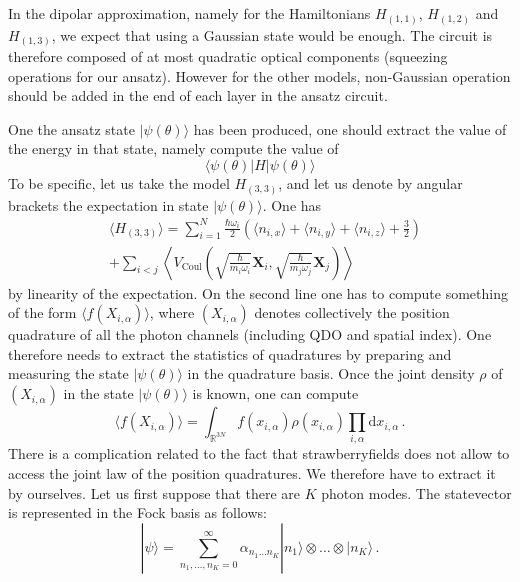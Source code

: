 \documentclass[reprint, amsmath, amssymb, aps]{revtex4-2}
\begin{document}
    In the dipolar approximation, namely for the Hamiltonians $H_{(1,1)}$, $H_{(1,2)}$ and $H_{(1,3)}$, we expect that using a Gaussian state would be enough. The circuit is therefore composed of at most quadratic optical components (squeezing operations for our ansatz). However for the other models,  non-Gaussian operation should be added in the end of each layer in the ansatz circuit.

    One the ansatz state $|\psi(\theta)\rangle$ has been produced, one should extract the value of the energy in that state, namely compute the value of
    \begin{equation}
        \langle\psi(\theta)|H|\psi(\theta)\rangle
    \end{equation}
    To be specific, let us take the model $H_{(3,3)}$, and let us denote by angular brackets the expectation in state $|\psi(\theta)\rangle$. One has
    \begin{equation}
    \label{eq:loss}
    \begin{split}
        &\langle H_{(3,3)}\rangle = \sum_{i=1}^N\frac{\hbar\omega_i}{2}\left(\langle n_{i,x}\rangle+\langle n_{i,y}\rangle+\langle n_{i,z}\rangle+\frac{3}{2}\right)\\
        &+ \sum_{i<j}\left\langle V_\text{Coul}\left(\sqrt{\frac{\hbar}{m_i\omega_i}}\bm X_i, \sqrt{\frac{\hbar}{m_j\omega_j}}\bm X_j\right)\right\rangle
    \end{split}
    \end{equation}
    by linearity of the expectation. On the second line one has to compute something of the form $\langle f(X_{i,\alpha})\rangle$, where $(X_{i,\alpha})$ denotes collectively the position quadrature of all the photon channels (including QDO and spatial index). One therefore needs to extract the statistics of quadratures by preparing and measuring the state $|\psi(\theta)\rangle$ in the quadrature basis. Once the joint density $\rho$ of $(X_{i,\alpha})$ in the state $|\psi(\theta)\rangle$ is known, one can compute
    \begin{equation}
        \langle f(X_{i,\alpha})\rangle = \int_{\mathbb R^{3N}}f(x_{i,\alpha})\rho(x_{i,\alpha})\prod_{i,\alpha}\text{d}x_{i,\alpha}\,.
    \end{equation}
    There is a complication related to the fact that strawberryfields does not allow to access the joint law of the position quadratures. We therefore have to extract it by ourselves. Let us first suppose that there are $K$ photon modes. The statevector is represented in the Fock basis as follows:
    \begin{equation}
        |\psi\rangle = \sum_{n_1,\dots,n_{K}=0}^\infty \alpha_{n_1\dots n_{K}}|n_1\rangle\otimes\dots\otimes|n_{K}\rangle\,.
    \end{equation}
\end{document}

